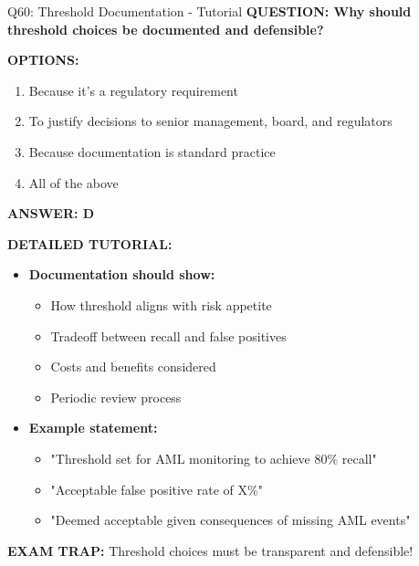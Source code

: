 \documentclass[8pt]{beamer}
\begin{document}
	\begin{frame}{Q60: Threshold Documentation - Tutorial}
		\fontsize{6.5}{7.5}\selectfont
		\textbf{QUESTION: Why should threshold choices be documented and defensible?}
		
		\vspace{0.1cm}
		\textbf{OPTIONS:}
		\begin{enumerate}
			\item Because it's a regulatory requirement
			\item To justify decisions to senior management, board, and regulators
			\item Because documentation is standard practice
			\item All of the above
		\end{enumerate}
		
		\vspace{0.1cm}
		\textcolor{myblue}{\textbf{ANSWER: D}}
		
		\vspace{0.1cm}
		\textbf{DETAILED TUTORIAL:}
		\begin{itemize}
			\item \textbf{Documentation should show:}
			\begin{itemize}
				\item How threshold aligns with risk appetite
				\item Tradeoff between recall and false positives
				\item Costs and benefits considered
				\item Periodic review process
			\end{itemize}
			\item \textbf{Example statement:}
			\begin{itemize}
				\item "Threshold set for AML monitoring to achieve 80\% recall"
				\item "Acceptable false positive rate of X\%"
				\item "Deemed acceptable given consequences of missing AML events"
			\end{itemize}
		\end{itemize}
		
		\textcolor{myred}{\textbf{EXAM TRAP:}} Threshold choices must be \textcolor{myblue}{transparent and defensible}!
	\end{frame}
	
\end{document}
